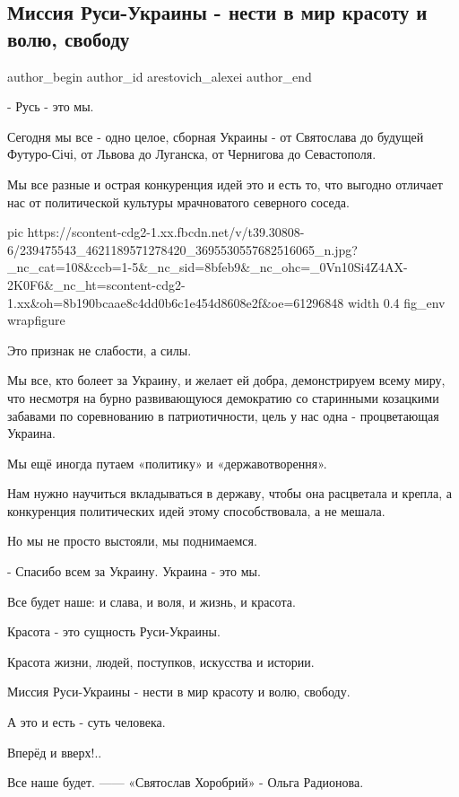  
 
 
 
 
 
\subsection{Миссия Руси-Украины - нести в мир красоту и волю, свободу}
\label{sec:24_08_2021.fb.arestovich_alexei.1.rusj_ukraina_my}
 
\ifcmt
 author_begin
   author_id arestovich_alexei
 author_end
\fi

- Русь - это мы.

Сегодня мы все - одно целое, сборная Украины - от Святослава до будущей
Футуро-Січі, от Львова до Луганска, от Чернигова до Севастополя. 

Мы все разные и острая конкуренция идей это и есть то, что выгодно отличает нас
от политической культуры мрачноватого северного соседа. 

\ifcmt
  pic https://scontent-cdg2-1.xx.fbcdn.net/v/t39.30808-6/239475543_4621189571278420_3695530557682516065_n.jpg?_nc_cat=108&ccb=1-5&_nc_sid=8bfeb9&_nc_ohc=_0Vn10Si4Z4AX-2K0F6&_nc_ht=scontent-cdg2-1.xx&oh=8b190bcaae8c4dd0b6c1e454d8608e2f&oe=61296848
  width 0.4
	fig_env wrapfigure
\fi

Это признак не слабости, а силы. 

Мы все, кто болеет за Украину, и желает ей добра, демонстрируем всему миру, что
несмотря на бурно развивающуюся демократию со старинными козацкими забавами по
соревнованию в патриотичности, цель у нас одна - процветающая Украина.

Мы ещё иногда путаем «политику» и «державотворення».

Нам нужно научиться вкладываться в державу, чтобы она расцветала и крепла, а
конкуренция политических идей этому способствовала, а не мешала.

Но мы не просто выстояли, мы поднимаемся.

- Спасибо всем за Украину. Украина - это мы.

Все будет наше: и слава, и воля, и жизнь, и красота. 

Красота - это сущность Руси-Украины. 

Красота жизни, людей, поступков, искусства и истории. 

Миссия Руси-Украины - нести в мир красоту и волю, свободу.

А это и есть - суть человека. 

Вперёд и вверх!..

Все наше будет. 
——
«Святослав Хоробрий» - Ольга Радионова.
